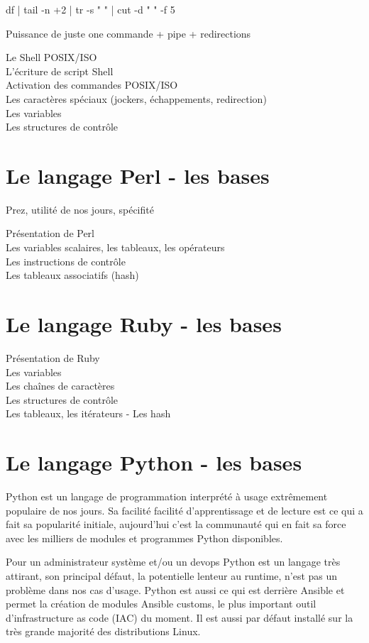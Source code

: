 \documentclass[11pt,a4paper]{article}
\begin{document}
df | tail -n +2 | tr -s " " | cut -d " " -f 5

Puissance de juste one commande + pipe + redirections

Le Shell POSIX/ISO\\
L'écriture de script Shell \\
Activation des commandes POSIX/ISO\\
Les caractères spéciaux (jockers, échappements, redirection)\\
Les variables\\
Les structures de contrôle\\

\section{Le langage Perl - les bases}
Prez, utilité de nos jours, spécifité

Présentation de Perl\\
Les variables scalaires, les tableaux, les opérateurs\\
Les instructions de contrôle\\
Les tableaux associatifs (hash)\\

\section{Le langage Ruby - les bases}
Présentation de Ruby\\
Les variables\\
Les chaînes de caractères\\
Les structures de contrôle\\
Les tableaux, les itérateurs - Les hash\\

\section{Le langage Python - les bases}
Python est un langage de programmation interprété à usage extrêmement populaire de nos jours.
Sa facilité facilité d'apprentissage et de lecture est ce qui a fait sa popularité initiale, aujourd'hui c'est la communauté qui en fait sa force avec les milliers de modules et programmes Python disponibles.

Pour un administrateur système et/ou un devops Python est un langage très attirant, son principal défaut, la potentielle lenteur au runtime, n'est pas un problème dans nos cas d'usage. Python est aussi ce qui est derrière Ansible et permet la création de modules Ansible customs, le plus important outil d'infrastructure as code (IAC) du moment.
Il est aussi par défaut installé sur la très grande majorité des distributions Linux.
\end{document}
